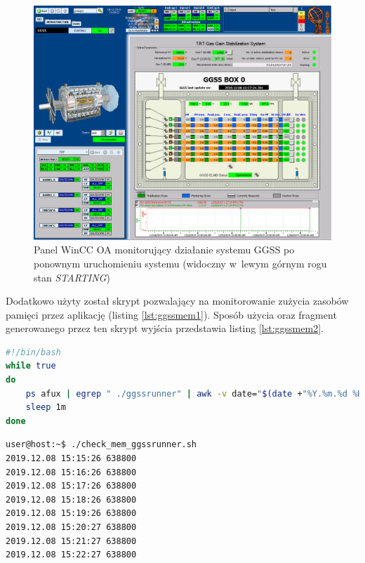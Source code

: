 \begin{figure}
\centering
\caption{Panel WinCC OA monitorujący działanie systemu GGSS po ponownym uruchomieniu systemu (widoczny w~lewym górnym rogu stan \textit{STARTING})}
\label{fig:ggssafterstart}
\includegraphics[width=\textwidth]{res/png/ggssPoStarcie}
\end{figure}

\newpage
Dodatkowo użyty został skrypt pozwalający na monitorowanie zużycia zasobów pamięci przez aplikację (listing \ref{lst:ggssmem1}). Sposób użycia oraz fragment generowanego przez ten skrypt wyjścia przedstawia listing \ref{lst:ggssmem2}. 

\begin{lstlisting}[language=bash, caption={Skrypt \textit{check\_mem\_ggssrunner.sh} służacy do monitorowania pamięci używanej przez aplikację \textit{ggssrunner}}, label={lst:ggssmem1}]
#!/bin/bash
while true
do
    ps afux | egrep " ./ggssrunner" | awk -v date="$(date +"%Y.%m.%d %H:%M:%S")" '{print date, $5}'
    sleep 1m
done
\end{lstlisting}


\begin{lstlisting}[language=Cmd, caption={Wywołanie oraz fragment wyjścia skryptu \textit{check\_mem\_ggssrunner.sh} służacego do monitorowania pamięci używanej przez aplikację \textit{ggssrunner}}, label={lst:ggssmem2}]
user@host:~$ ./check_mem_ggssrunner.sh
2019.12.08 15:15:26 638800
2019.12.08 15:16:26 638800
2019.12.08 15:17:26 638800
2019.12.08 15:18:26 638800
2019.12.08 15:19:26 638800
2019.12.08 15:20:27 638800
2019.12.08 15:21:27 638800
2019.12.08 15:22:27 638800
\end{lstlisting}

